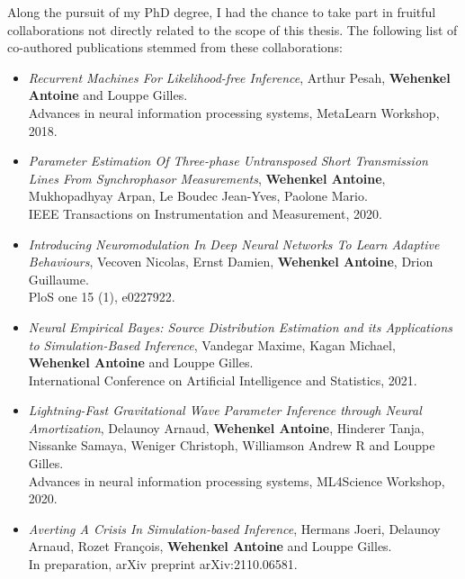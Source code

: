 Along the pursuit of my PhD degree, I had the chance to take part in fruitful collaborations not directly related to the scope of this thesis.
The following list of co-authored publications stemmed from these collaborations:

\begin{tcolorbox}[breakable,width=\textwidth,colback={grey},title={Extra contributions},outer arc=0mm,coltitle=white]

\begin{itemize}
\item[] \citep{pesah2018recurrent} \textit{Recurrent Machines For Likelihood-free Inference},
Arthur Pesah, \textbf{Wehenkel Antoine} and Louppe Gilles.\\
Advances in neural information processing systems, MetaLearn Workshop, 2018.

\item[] \citep{wehenkel2020parameter} \textit{Parameter Estimation Of Three-phase Untransposed Short Transmission Lines From Synchrophasor Measurements},
\textbf{Wehenkel Antoine}, Mukhopadhyay Arpan, Le Boudec Jean-Yves, Paolone Mario.\\
IEEE Transactions on Instrumentation and Measurement, 2020.

\item[] \citep{vecoven2020introducing} \textit{Introducing Neuromodulation In Deep Neural Networks To Learn Adaptive Behaviours},
Vecoven Nicolas, Ernst Damien, \textbf{Wehenkel Antoine}, Drion Guillaume.\\
PloS one 15 (1), e0227922.

\item[] \citep{vandegar2021neural} \textit{Neural Empirical Bayes: Source Distribution Estimation and its Applications to Simulation-Based Inference},
Vandegar Maxime, Kagan Michael, \textbf{Wehenkel Antoine} and Louppe Gilles.\\
International Conference on Artificial Intelligence and Statistics, 2021.

\item[] \citep{delaunoy2020lightning} \textit{Lightning-Fast Gravitational Wave Parameter Inference through Neural Amortization},
Delaunoy Arnaud, \textbf{Wehenkel Antoine}, Hinderer Tanja, Nissanke Samaya, Weniger Christoph, Williamson Andrew R and Louppe Gilles.\\
Advances in neural information processing systems, ML4Science Workshop, 2020.

\item[] \citep{hermans2021averting} \textit{Averting A Crisis In Simulation-based Inference},
Hermans Joeri, Delaunoy Arnaud, Rozet Fran{\c{c}}ois, \textbf{Wehenkel Antoine} and Louppe Gilles.\\
In preparation, arXiv preprint arXiv:2110.06581.


\end{itemize}
\end{tcolorbox}
